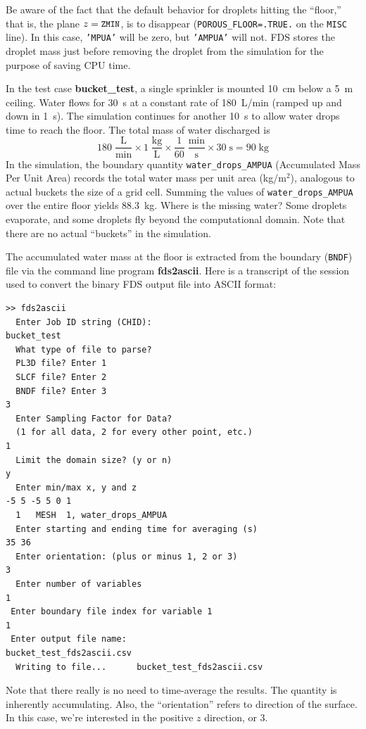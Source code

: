 \documentclass[11pt]{book}
\newcommand{\ct}{\tt\small}
\newcommand{\be}{\begin{equation}}
\newcommand{\ee}{\end{equation}}
\begin{document}
Be aware of the fact that the default behavior for droplets hitting the ``floor,'' that is, the plane $z=\hbox{\ct ZMIN}$,
is to disappear ({\ct POROUS\_FLOOR=.TRUE.} on the {\ct MISC} line).
In this case, {\ct 'MPUA'} will be zero, but {\ct 'AMPUA'} will not. FDS stores the droplet mass just before removing the droplet from
the simulation for the purpose of saving CPU time.

In the test case {\bf bucket\_test}, a single sprinkler is
mounted 10~cm below a 5~m ceiling. Water flows for 30~s at a constant
rate of 180~L/min (ramped up and down in 1~s).  The simulation continues for another 10~s to allow
water drops time to reach the floor. The total mass of water discharged is
\be
  \mathrm{ 180 \; \frac{L}{min} \times 1 \; \frac{kg}{L} \times \frac{1}{60} \; \frac{min}{s} \times 30 \; s = 90 \; kg }
\ee
In the simulation, the boundary quantity {\ct water\_drops\_AMPUA}
(Accumulated Mass Per Unit Area) records the total water mass per
unit area (kg/m$^2$), analogous to actual buckets the size of a grid cell.
Summing the values of {\ct water\_drops\_AMPUA} over the entire
floor yields 88.3~kg. Where is the missing water? Some droplets evaporate, and some droplets
fly beyond the computational domain. Note that
there are no actual ``buckets'' in the simulation.

The accumulated water mass at the floor is extracted from
the boundary ({\ct BNDF}) file via the command line program
{\bf fds2ascii}. Here is a transcript of the session
used to convert the binary FDS output file into ASCII format:

\footnotesize
\begin{verbatim}
>> fds2ascii
  Enter Job ID string (CHID):
bucket_test
  What type of file to parse?
  PL3D file? Enter 1
  SLCF file? Enter 2
  BNDF file? Enter 3
3
  Enter Sampling Factor for Data?
  (1 for all data, 2 for every other point, etc.)
1
  Limit the domain size? (y or n)
y
  Enter min/max x, y and z
-5 5 -5 5 0 1
  1   MESH  1, water_drops_AMPUA
  Enter starting and ending time for averaging (s)
35 36
  Enter orientation: (plus or minus 1, 2 or 3)
3
  Enter number of variables
1
 Enter boundary file index for variable 1
1
 Enter output file name:
bucket_test_fds2ascii.csv
  Writing to file...      bucket_test_fds2ascii.csv
\end{verbatim}

\normalsize \noindent
Note that there really is no need to time-average the results. The quantity is inherently accumulating. Also, the
``orientation'' refers to direction of the surface. In this case, we're interested in the positive $z$ direction, or 3.
\end{document}
